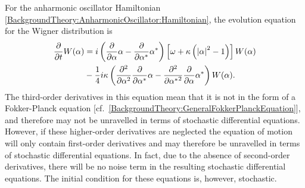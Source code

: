 For the anharmonic oscillator Hamiltonian \eqref{BackgroundTheory:AnharmonicOscillator:Hamiltonian}, the evolution equation for the Wigner distribution is
\begin{align}
    \label{BackgroundTheory:AnharmonicOscillator:WignerEvolution}
    \begin{split}
        \frac{\partial}{\partial t} W(\alpha) &=  i\left( \frac{\partial}{\partial \alpha} \alpha - \frac{\partial}{\partial \alpha^*} \alpha^*\right) \left[\omega + \kappa\left(\abs{\alpha}^2 - 1\right) \right] W(\alpha)\\
        &-\frac{1}{4}i \kappa \left(\frac{\partial^2}{\partial \alpha^2}\frac{\partial}{\partial \alpha^*}\alpha - \frac{\partial^2}{\partial {\alpha^*}^2} \frac{\partial}{\partial \alpha} \alpha^*\right) W(\alpha).
    \end{split}
\end{align}
The third-order derivatives in this equation mean that it is not in the form of a Fokker-Planck equation [cf.\ \eqref{BackgroundTheory:GeneralFokkerPlanckEquation}], and therefore may not be unravelled in terms of stochastic differential equations.  However, if these higher-order derivatives are neglected the equation of motion will only contain first-order derivatives and may therefore be unravelled in terms of stochastic differential equations.  In fact, due to the absence of second-order derivatives, there will be no noise term in the resulting stochastic differential equations.  The initial condition for these equations is, however, stochastic. 

